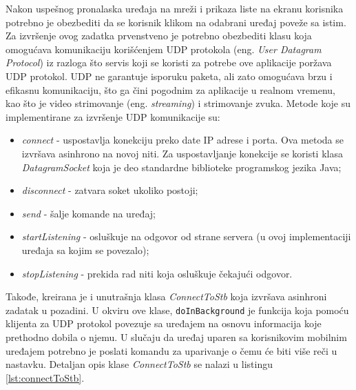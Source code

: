 \documentclass[struktura.tex]{subfiles}
\begin{document}
Nakon uspešnog pronalaska uređaja na mreži i prikaza liste na ekranu korisnika potrebno je obezbediti da se korisnik klikom na odabrani uređaj poveže sa istim. Za izvršenje ovog zadatka prvenstveno je potrebno obezbediti klasu koja omogućava komunikaciju korišćenjem UDP protokola (eng. \textit{User Datagram Protocol}) iz razloga što servis koji se koristi za potrebe ove aplikacije poržava UDP protokol. UDP ne garantuje isporuku paketa, ali zato omogućava brzu i efikasnu komunikaciju, što ga čini pogodnim za aplikacije u realnom vremenu, kao što je video strimovanje (eng. \textit{streaming}) i strimovanje zvuka. Metode koje su implementirane za izvršenje UDP komunikacije su:
\begin{itemize}
    \item \textit{connect} - uspostavlja konekciju preko date IP adrese i porta. Ova metoda se izvršava asinhrono na novoj niti. Za uspostavljanje konekcije se koristi klasa \textit{DatagramSocket} koja je deo standardne biblioteke programskog jezika Java; 
    \item \textit{disconnect} - zatvara soket ukoliko postoji;
    \item \textit{send} - šalje komande na uređaj;
    \item \textit{startListening} - osluškuje na odgovor od strane servera (u ovoj implementaciji uređaja sa kojim se povezalo);
    \item \textit{stopListening} - prekida rad niti koja osluškuje čekajući odgovor.
    
\end{itemize}


Takođe, kreirana je i unutrašnja klasa \textit{ConnectToStb} koja izvršava asinhroni zadatak u pozadini. U okviru ove klase, \verb|doInBackground| je funkcija koja pomoću klijenta za UDP protokol povezuje sa uređajem na osnovu informacija koje prethodno dobila o njemu. U slučaju da uređaj uparen sa korisnikovim mobilnim uređajem potrebno je poslati komandu za uparivanje o čemu će biti više reči u nastavku. Detaljan opis klase \textit{ConnectToStb} se nalazi u listingu \ref{lst:connectToStb}.


\end{document}
